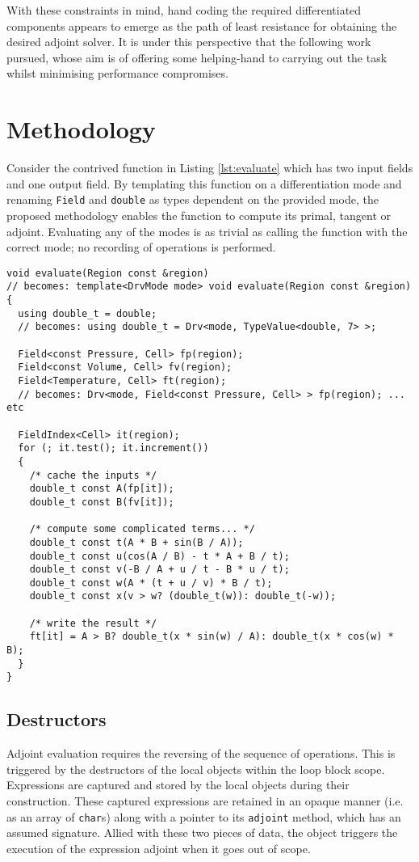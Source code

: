 \documentclass[a4paper,10pt]{article}
\begin{document}
With these constraints in mind, hand coding the required differentiated components appears to emerge as the path of least resistance for obtaining the desired adjoint solver. It is under this perspective that the following work pursued, whose aim is of offering some helping-hand to carrying out the task whilst minimising performance compromises.

\section{Methodology}
Consider the contrived function in Listing \ref{lst:evaluate} which has two input fields and one output field. By templating this function on a differentiation mode and renaming \texttt{Field} and \texttt{double} as types dependent on the provided mode, the proposed methodology enables the function to compute its primal, tangent or adjoint. Evaluating any of the modes is as trivial as calling the function with the correct mode; no recording of operations is performed.

\begin{lstlisting}[caption={The common task of looping over all elements, filling the output field.}, label=lst:evaluate]
void evaluate(Region const &region)
// becomes: template<DrvMode mode> void evaluate(Region const &region)
{
  using double_t = double;
  // becomes: using double_t = Drv<mode, TypeValue<double, 7> >;

  Field<const Pressure, Cell> fp(region);
  Field<const Volume, Cell> fv(region);
  Field<Temperature, Cell> ft(region);
  // becomes: Drv<mode, Field<const Pressure, Cell> > fp(region); ... etc

  FieldIndex<Cell> it(region);
  for (; it.test(); it.increment())
  {
    /* cache the inputs */
    double_t const A(fp[it]);
    double_t const B(fv[it]);

    /* compute some complicated terms... */
    double_t const t(A * B + sin(B / A));
    double_t const u(cos(A / B) - t * A + B / t);
    double_t const v(-B / A + u / t - B * u / t);
    double_t const w(A * (t + u / v) * B / t);
    double_t const x(v > w? (double_t(w)): double_t(-w));

    /* write the result */
    ft[it] = A > B? double_t(x * sin(w) / A): double_t(x * cos(w) * B);
  }
}
\end{lstlisting}

\subsection{Destructors}
Adjoint evaluation requires the reversing of the sequence of operations. This is triggered by the destructors of the local objects within the loop block scope. Expressions are captured and stored by the local objects during their construction. These captured expressions are retained in an opaque manner (i.e. as an array of \texttt{char}s) along with a pointer to its \texttt{adjoint} method, which has an assumed signature. Allied with these two pieces of data, the object triggers the execution of the expression adjoint when it goes out of scope.
\end{document}
